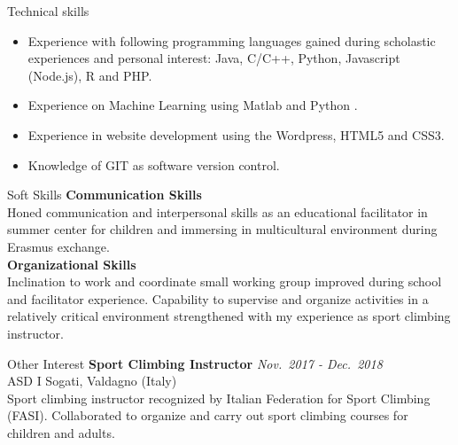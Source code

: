 \documentclass{resume} %
\begin{document}
\begin{rSection}{Technical skills}
    \begin{itemize}        
        \item Experience with following programming languages gained during scholastic experiences and personal interest: Java, C/C++, Python, Javascript (Node.js), R and PHP.
        \item Experience on Machine Learning using Matlab and Python .
        \item Experience in website development using the Wordpress, HTML5 and CSS3.
        \item Knowledge of GIT as software version control.
    \end{itemize}    
\end{rSection}

\begin{rSection}{Soft Skills}
        {\bf Communication Skills}\\
        Honed communication and interpersonal skills as an educational facilitator in summer center for children and immersing in multicultural environment during Erasmus exchange. \\
        {\bf Organizational Skills}\\
        Inclination to work and coordinate small working group improved during school and facilitator experience.
        Capability to supervise and organize activities in a relatively critical environment strengthened with my experience as sport climbing instructor.
\end{rSection}

\begin{rSection}{Other Interest}
    {\bf Sport Climbing Instructor}
    \hfill {\em Nov.~2017 - Dec.~2018}\\
    ASD I Sogati, Valdagno (Italy) \\
    Sport climbing instructor recognized by Italian Federation for Sport Climbing (FASI). Collaborated to organize and carry out sport climbing courses for children and adults.
\end{rSection}
\end{document}
